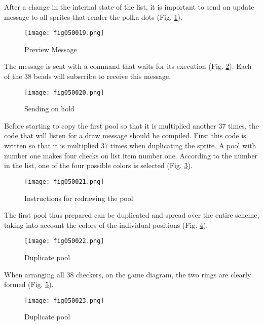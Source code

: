 After a change in the internal state of the list, it is important to send an update message to all sprites that render the polka dots (Fig. \ref{fig050019}).

\begin{figure}[H]
   \centering
   \texttt{[image: fig050019.png]}
   \caption{Preview Message}
\label{fig050019}
\end{figure}

The message is sent with a command that waits for its execution (Fig. \ref{fig050020}). Each of the 38 beads will subscribe to receive this message.

\begin{figure}[H]
   \centering
   \texttt{[image: fig050020.png]}
   \caption{Sending on hold}
\label{fig050020}
\end{figure}

Before starting to copy the first pool so that it is multiplied another 37 times, the code that will listen for a draw message should be compiled. First this code is written so that it is multiplied 37 times when duplicating the sprite. A pool with number one makes four checks on list item number one. According to the number in the list, one of the four possible colors is selected (Fig. \ref{fig050021}).

\begin{figure}[H]
   \centering
   \texttt{[image: fig050021.png]}
   \caption{Instructions for redrawing the pool}
\label{fig050021}
\end{figure}

The first pool thus prepared can be duplicated and spread over the entire scheme, taking into account the colors of the individual positions (Fig. \ref{fig050022}).

\begin{figure}[H]
   \centering
   \texttt{[image: fig050022.png]}
   \caption{Duplicate pool}
\label{fig050022}
\end{figure}

When arranging all 38 checkers, on the game diagram, the two rings are clearly formed (Fig. \ref{fig050023}).

\begin{figure}[H]
   \centering
   \texttt{[image: fig050023.png]}
   \caption{Duplicate pool}
\label{fig050023}
\end{figure}

